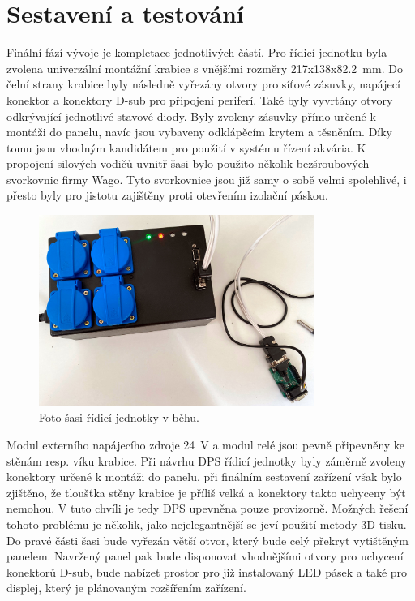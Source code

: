 \chapter{Sestavení a testování}

Finální fází vývoje je kompletace jednotlivých částí. Pro řídicí jednotku byla zvolena univerzální montážní krabice s vnějšími rozměry 217x138x\qty{82.2}{mm}. Do čelní strany krabice byly následně vyřezány otvory pro síťové zásuvky, napájecí konektor a konektory D-sub pro připojení periferí. Také byly vyvrtány otvory odkrývající jednotlivé stavové diody. Byly zvoleny zásuvky přímo určené k montáži do panelu, navíc jsou vybaveny odklápěcím krytem a těsněním. Díky tomu jsou vhodným kandidátem pro použití v systému řízení akvária. K propojení silových vodičů uvnitř šasi bylo použito několik bezšroubových svorkovnic firmy Wago. Tyto svorkovnice jsou již samy o sobě velmi spolehlivé, i přesto byly pro jistotu zajištěny proti otevřením izolační páskou. 

\begin{figure}[h!]
    \centering
    \includegraphics[width=0.8\textwidth]{obrazky/foto/zarizeni_beh.jpeg}
    \caption{Foto šasi řídicí jednotky v běhu.}
    \label{fig:obrazky-foto-zarizeni_beh-jpeg}
\end{figure}

Modul externího napájecího zdroje \qty{24}{V} a modul relé jsou pevně připevněny ke stěnám resp. víku krabice. Při návrhu DPS řídicí jednotky byly záměrně zvoleny konektory určené k montáži do panelu, při finálním sestavení zařízení však bylo zjištěno, že tloušťka stěny krabice je příliš velká a konektory takto uchyceny být nemohou. V tuto chvíli je tedy DPS upevněna pouze provizorně. Možných řešení tohoto problému je několik, jako nejelegantnější se jeví použití metody 3D tisku. Do pravé části šasi bude vyřezán větší otvor, který bude celý překryt vytištěným panelem. Navržený panel pak bude disponovat vhodnějšími otvory pro uchycení konektorů D-sub, bude nabízet prostor pro již instalovaný LED pásek a také pro displej, který je plánovaným rozšířením zařízení.  

